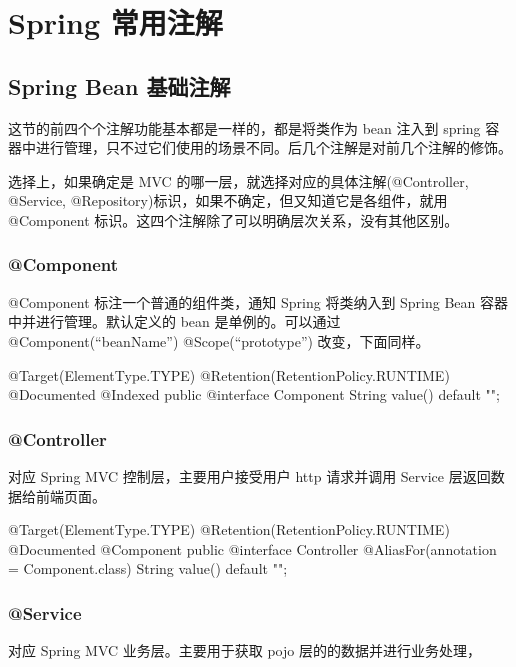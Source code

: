 \section{Spring 常用注解}
\subsection{Spring Bean 基础注解}

这节的前四个个注解功能基本都是一样的，都是将类作为 bean 注入到 spring 容器中进行管理，只不过它们使用的场景不同。后几个注解是对前几个注解的修饰。

选择上，如果确定是 MVC 的哪一层，就选择对应的具体注解(@Controller, @Service, @Repository)标识，如果不确定，但又知道它是各组件，就用 @Component 标识。这四个注解除了可以明确层次关系，没有其他区别。

\subsubsection{@Component}

@Component 标注一个普通的组件类，通知 Spring 将类纳入到 Spring Bean 容器中并进行管理。默认定义的 bean 是单例的。可以通过 @Component(“beanName”) @Scope(“prototype”) 改变，下面同样。

\begin{Java}
@Target(ElementType.TYPE)
@Retention(RetentionPolicy.RUNTIME)
@Documented
@Indexed
public @interface Component {
    String value() default "";
}
\end{Java}

\subsubsection{@Controller}

对应 Spring MVC 控制层，主要用户接受用户 http 请求并调用 Service 层返回数据给前端页面。

\begin{Java}
@Target(ElementType.TYPE)
@Retention(RetentionPolicy.RUNTIME)
@Documented
@Component
public @interface Controller {
    @AliasFor(annotation = Component.class)
    String value() default "";
}
\end{Java}

\subsubsection{@Service}

对应 Spring MVC 业务层。主要用于获取 pojo 层的的数据并进行业务处理，

